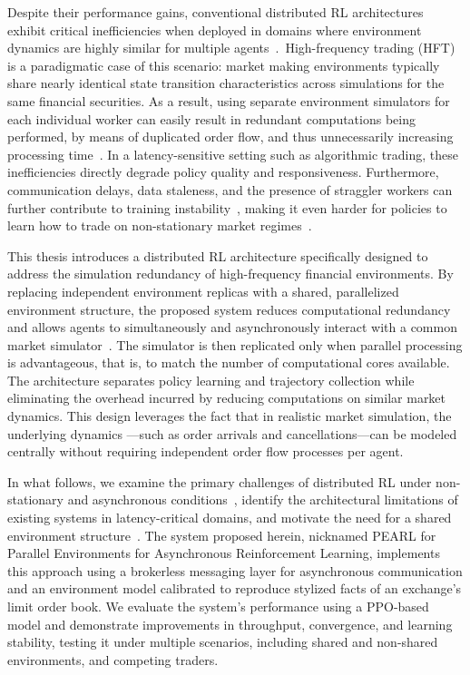 Despite their performance gains, conventional distributed RL architectures exhibit critical inefficiencies when
deployed in domains where environment dynamics are highly similar for multiple agents~\cite{AlSaffar2023,Lu2024}.\
High-frequency trading (HFT) is a paradigmatic case of this scenario: market making environments typically share nearly
identical state transition characteristics across simulations for the same financial securities.
As a result, using separate environment simulators for each individual worker can easily result in redundant computations being performed,
by means of duplicated order flow, and thus unnecessarily increasing processing time~\cite{Hou2025}.
In a latency-sensitive setting such as algorithmic trading, these inefficiencies directly degrade policy quality and responsiveness.
Furthermore, communication delays, data staleness, and the presence of straggler workers can further contribute to training instability~\cite{He2022,Xie2023},
making it even harder for policies to learn how to trade on non-stationary market regimes~\cite{Borzilov2025}.

This thesis introduces a distributed RL architecture specifically designed to address the simulation redundancy of high-frequency financial environments.
By replacing independent environment replicas with a shared, parallelized environment structure,
the proposed system reduces computational redundancy and allows agents to simultaneously and asynchronously interact with a common market simulator~\cite{yin2024distributed,spreeze2024high}.
The simulator is then replicated only when parallel processing is advantageous, that is,
to match the number of computational cores available.
The architecture separates policy learning and trajectory collection while eliminating the overhead incurred by reducing computations on similar market dynamics.
This design leverages the fact that in realistic market simulation, the underlying dynamics
---such as order arrivals and cancellations---can be modeled centrally without requiring independent order flow processes per agent.

In what follows, we examine the primary challenges of distributed RL under non-stationary and asynchronous conditions~\cite{doi:10.48550/arxiv.2312.10256},
identify the architectural limitations of existing systems in latency-critical domains, and motivate the need for a shared environment structure~\cite{wos:001207755100255,wos:000827652300011}.
The system proposed herein, nicknamed PEARL for Parallel Environments for Asynchronous Reinforcement Learning,
implements this approach using a brokerless messaging layer for asynchronous communication and an environment model
calibrated to reproduce stylized facts of an exchange's limit order book.
We evaluate the system's performance using a PPO-based model and demonstrate improvements in
throughput, convergence, and learning stability, testing it under multiple scenarios, including shared and non-shared environments, and competing traders.



